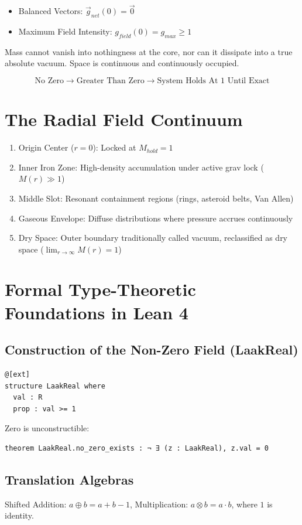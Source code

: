 \documentclass[12pt,a4paper]{article}
\begin{document}
\begin{itemize}
\item Balanced Vectors: $\vec{g}_{net}(0) = \vec{0}$
\item Maximum Field Intensity: $g_{field}(0) = g_{max} \ge 1$
\end{itemize}

Mass cannot vanish into nothingness at the core, nor can it dissipate into a true absolute vacuum. Space is continuous and continuously occupied.

$$\text{No Zero} \rightarrow \text{Greater Than Zero} \rightarrow \text{System Holds At 1 Until Exact}$$

\section{The Radial Field Continuum}
\begin{enumerate}
\item Origin Center ($r=0$): Locked at $M_{hold}=1$
\item Inner Iron Zone: High-density accumulation under active grav lock ($M(r) \gg 1$)
\item Middle Slot: Resonant containment regions (rings, asteroid belts, Van Allen)
\item Gaseous Envelope: Diffuse distributions where pressure accrues continuously
\item Dry Space: Outer boundary traditionally called vacuum, reclassified as dry space ($\lim_{r\to\infty} M(r)=1$)
\end{enumerate}

\section{Formal Type-Theoretic Foundations in Lean 4}

\subsection{Construction of the Non-Zero Field (LaakReal)}
\begin{verbatim}
@[ext]
structure LaakReal where
  val : R
  prop : val >= 1
\end{verbatim}

Zero is unconstructible:
\begin{verbatim}
theorem LaakReal.no_zero_exists : ¬ ∃ (z : LaakReal), z.val = 0
\end{verbatim}

\subsection{Translation Algebras}
Shifted Addition: $a \oplus b = a+b-1$, Multiplication: $a \otimes b = a\cdot b$, where $1$ is identity.
\end{document}
